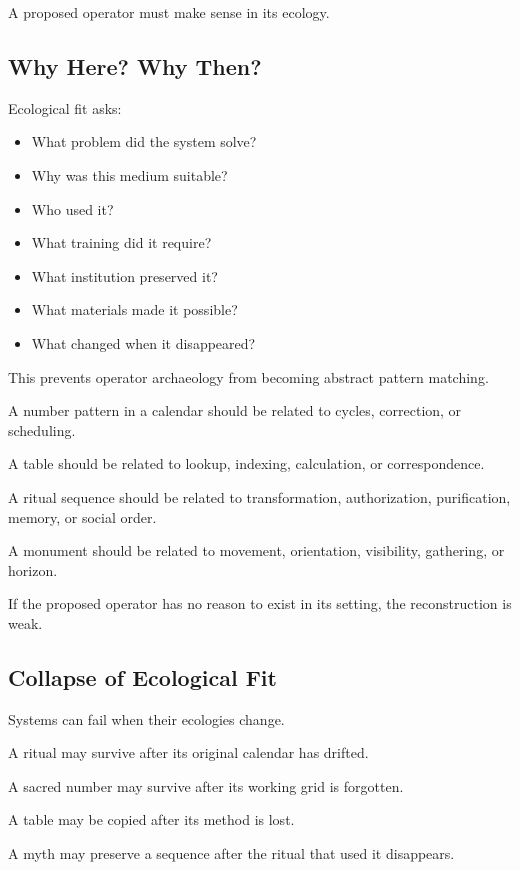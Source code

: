 \documentclass[11pt]{book}
\begin{document}
A proposed operator must make sense in its ecology.

\subsection{Why Here? Why Then?}

Ecological fit asks:

\begin{itemize}
    \item What problem did the system solve?
    \item Why was this medium suitable?
    \item Who used it?
    \item What training did it require?
    \item What institution preserved it?
    \item What materials made it possible?
    \item What changed when it disappeared?
\end{itemize}

This prevents operator archaeology from becoming abstract pattern matching.

A number pattern in a calendar should be related to cycles, correction, or scheduling.

A table should be related to lookup, indexing, calculation, or correspondence.

A ritual sequence should be related to transformation, authorization, purification, memory, or social order.

A monument should be related to movement, orientation, visibility, gathering, or horizon.

If the proposed operator has no reason to exist in its setting, the reconstruction is weak.

\subsection{Collapse of Ecological Fit}

Systems can fail when their ecologies change.

A ritual may survive after its original calendar has drifted.

A sacred number may survive after its working grid is forgotten.

A table may be copied after its method is lost.

A myth may preserve a sequence after the ritual that used it disappears.
\end{document}
